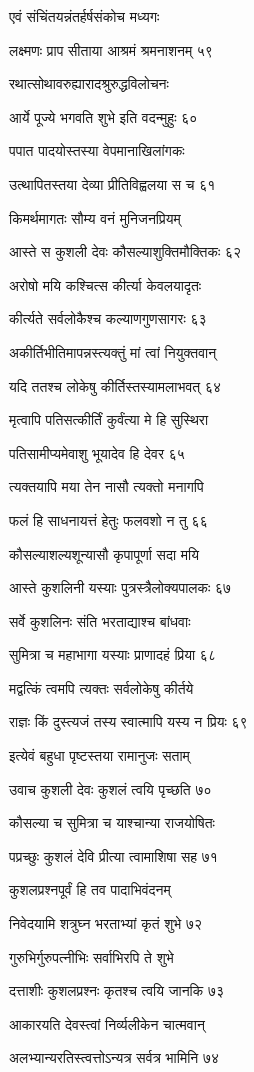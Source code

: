 एवं संचिंतयन्नंतर्हर्षसंकोच मध्यगः

लक्ष्मणः प्राप सीताया आश्रमं श्रमनाशनम् ५९

रथात्सोथावरुह्यारादश्रुरुद्धविलोचनः

आर्ये पूज्ये भगवति शुभे इति वदन्मुहुः ६०

पपात पादयोस्तस्या वेपमानाखिलांगकः

उत्थापितस्तया देव्या प्रीतिविह्वलया स च ६१

किमर्थमागतः सौम्य वनं मुनिजनप्रियम्

आस्ते स कुशली देवः कौसल्याशुक्तिमौक्तिकः ६२

अरोषो मयि कश्चित्स कीर्त्या केवलयादृतः

कीर्त्यते सर्वलोकैश्च कल्याणगुणसागरः ६३

अकीर्तिभीतिमापन्नस्त्यक्तुं मां त्वां नियुक्तवान्

यदि ततश्च लोकेषु कीर्तिस्तस्यामलाभवत् ६४

मृत्वापि पतिसत्कीर्तिं कुर्वंत्या मे हि सुस्थिरा

पतिसामीप्यमेवाशु भूयादेव हि देवर ६५

त्यक्तयापि मया तेन नासौ त्यक्तो मनागपि

फलं हि साधनायत्तं हेतुः फलवशो न तु ६६

कौसल्याशल्यशून्यासौ कृपापूर्णा सदा मयि

आस्ते कुशलिनी यस्याः पुत्रस्त्रैलोक्यपालकः ६७

सर्वे कुशलिनः संति भरताद्याश्च बांधवाः

सुमित्रा च महाभागा यस्याः प्राणादहं प्रिया ६८

मद्वत्किं त्वमपि त्यक्तः सर्वलोकेषु कीर्तये

राज्ञः किं दुस्त्यजं तस्य स्वात्मापि यस्य न प्रियः ६९

इत्येवं बहुधा पृष्टस्तया रामानुजः सताम्

उवाच कुशली देवः कुशलं त्वयि पृच्छति ७०

कौसल्या च सुमित्रा च याश्चान्या राजयोषितः

पप्रच्छुः कुशलं देवि प्रीत्या त्वामाशिषा सह ७१

कुशलप्रश्नपूर्वं हि तव पादाभिवंदनम्

निवेदयामि शत्रुघ्न भरताभ्यां कृतं शुभे ७२

गुरुभिर्गुरुपत्नीभिः सर्वाभिरपि ते शुभे

दत्ताशीः कुशलप्रश्नः कृतश्च त्वयि जानकि ७३

आकारयति देवस्त्वां निर्व्यलीकेन चात्मवान्

अलभ्यान्यरतिस्त्वत्तोऽन्यत्र सर्वत्र भामिनि ७४

